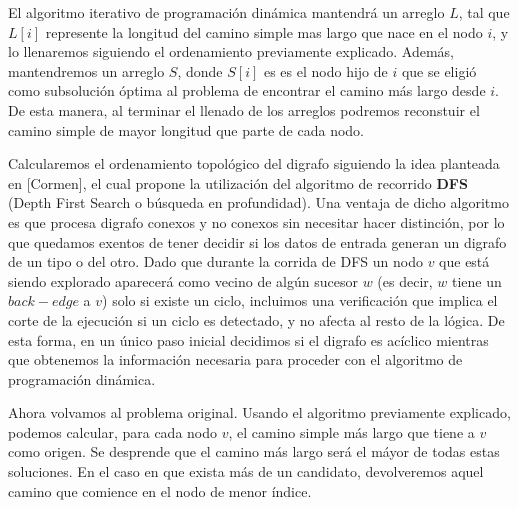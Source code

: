 El algoritmo iterativo de programaci\'on din\'amica mantendr\'a un arreglo $L$, tal que $L[i]$ represente la longitud del camino simple mas largo que nace en el nodo $i$, y lo llenaremos siguiendo el ordenamiento previamente explicado. 
Adem\'as, mantendremos un arreglo $S$, donde $S[i]$ es es el nodo hijo de $i$ que se eligi\'o como subsoluci\'on \'optima al problema de encontrar el camino m\'as largo desde $i$. De esta manera, al terminar el llenado de los arreglos podremos reconstuir el camino simple de mayor longitud que parte de cada nodo.

Calcularemos el ordenamiento topol\'ogico del digrafo siguiendo la idea planteada en [Cormen], el cual propone la utilizaci\'on del algoritmo de recorrido \textbf{DFS} (Depth First Search o búsqueda en profundidad). 
Una ventaja de dicho algoritmo es que procesa digrafo conexos y no conexos sin necesitar hacer distinci\'on, por lo que quedamos exentos de tener decidir si los datos de entrada generan un digrafo de un tipo o del otro. 
Dado que durante la corrida de DFS un nodo $v$ que est\'a siendo explorado aparecer\'a como vecino de alg\'un sucesor $w$ (es decir, $w$ tiene un $back-edge$ a $v$) solo si existe un ciclo, incluimos una verificaci\'on que implica el corte de la ejecuci\'on si un ciclo es detectado, y no afecta al resto de la l\'ogica.
De esta forma, en un \'unico paso inicial decidimos si el digrafo es ac\'iclico mientras que obtenemos la informaci\'on necesaria para proceder con el algoritmo de programaci\'on din\'amica. 

Ahora volvamos al problema original. 
Usando el algoritmo previamente explicado, podemos calcular, para cada nodo $v$, el camino simple m\'as largo que tiene a $v$ como origen.
Se desprende que el camino m\'as largo ser\'a el m\'ayor de todas estas soluciones. En el caso en que exista m\'as de un candidato, devolveremos aquel camino que comience en el nodo de menor \'indice. 



